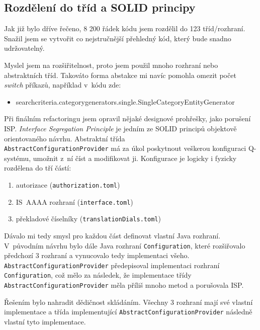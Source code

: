 \documentclass[thesis=M,czech]{FITthesis}[2019/12/23]
\begin{document}
\subsection{Rozdělení do tříd a SOLID principy}
Jak již bylo dříve řečeno, 8 200 řádek kódu jsem rozdělil do 123 tříd\slash rozhraní. Snažil jsem se vytvořit co nejstručnější přehledný kód, který bude snadno udržovatelný. 

Myslel jsem na rozšiřitelnost, proto jsem použil mnoho rozhraní nebo abstraktních tříd. Takováto forma abstakce mi navíc pomohla omezit počet \textit{switch} příkazů, například v~kódu zde: \cite{EliminateSwitch}
\begin{itemize}
	\item searchcriteria.categorygenerators.single.SingleCategoryEntityGenerator
\end{itemize} 

Při finálním refactoringu jsem opravil nějaké designové prohřešky, jako porušení ISP. \textit{Interface Segregation Principle} je jedním ze SOLID principů objektově orientovaného návrhu. 
Abstraktní třída \\\texttt{AbstractConfigurationProvider} má za úkol poskytnout veškerou konfiguraci Q-systému, umožnit z~ní číst a modifikovat ji.
Konfigurace je logicky i fyzicky rozdělena do tří částí:
\begin{enumerate}
	\item autorizace (\texttt{authorization.toml})
	\item IS~AAAA rozhraní (\texttt{interface.toml})
	\item překladové číselníky (\texttt{translationDials.toml})
\end{enumerate}

Dávalo mi tedy smysl pro každou část definovat vlastní Java rozhraní. V~původním návrhu bylo dále Java rozhraní \texttt{Configuration}, které rozšiřovalo předchozí 3 rozhraní a vynucovalo tedy implementaci všeho. \\\texttt{AbstractConfigurationProvider} předepisoval implementaci rozhraní \\\texttt{Configuration}, což mělo za následek, že implementace třídy \\\texttt{AbstractConfigurationProvider} měla příliš mnoho metod a porušovala ISP.

Řešením bylo nahradit dědičnost skládáním. Všechny 3 rozhraní mají své vlastní implementace a třída implementující \texttt{AbstractConfigurationProvider} následně vlastní tyto implementace. \cite{InheritanceVsComposition}
\end{document}
